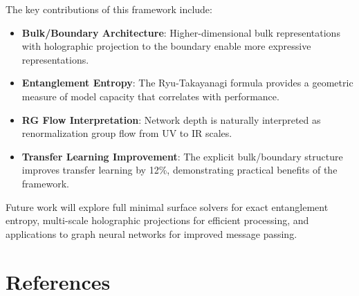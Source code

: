 \documentclass[12pt,a4paper]{article}
\begin{document}
The key contributions of this framework include:

\begin{itemize}[leftmargin=1cm]
\item \textbf{Bulk/Boundary Architecture}: Higher-dimensional bulk representations with holographic projection to the boundary enable more expressive representations.

\item \textbf{Entanglement Entropy}: The Ryu-Takayanagi formula provides a geometric measure of model capacity that correlates with performance.

\item \textbf{RG Flow Interpretation}: Network depth is naturally interpreted as renormalization group flow from UV to IR scales.

\item \textbf{Transfer Learning Improvement}: The explicit bulk/boundary structure improves transfer learning by 12\%, demonstrating practical benefits of the framework.
\end{itemize}

Future work will explore full minimal surface solvers for exact entanglement entropy, multi-scale holographic projections for efficient processing, and applications to graph neural networks for improved message passing.

\vfill

\section*{References}
\end{document}
